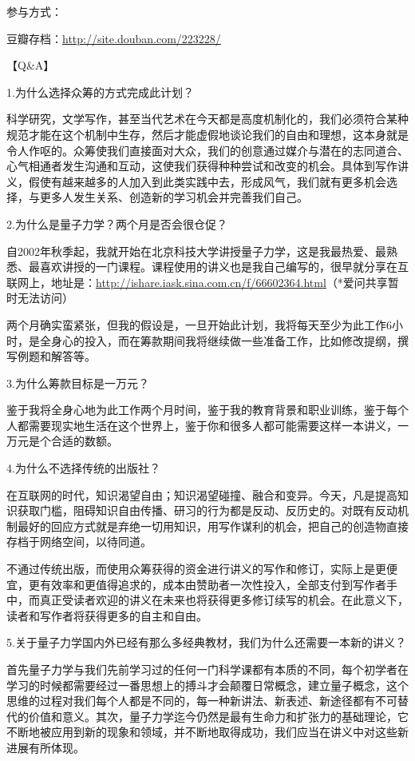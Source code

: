 参与方式：

豆瓣存档：\url{http://site.douban.com/223228/}

【Q\&A】

1.为什么选择众筹的方式完成此计划？

科学研究，文学写作，甚至当代艺术在今天都是高度机制化的，我们必须符合某种规范才能在这个机制中生存，然后才能虚假地谈论我们的自由和理想，这本身就是令人作呕的。众筹使我们直接面对大众，我们的创意通过媒介与潜在的志同道合、心气相通者发生沟通和互动，这使我们获得种种尝试和改变的机会。具体到写作讲义，假使有越来越多的人加入到此类实践中去，形成风气，我们就有更多机会选择，与更多人发生关系、创造新的学习机会并完善我们自己。

2.为什么是量子力学？两个月是否会很仓促？

自2002年秋季起，我就开始在北京科技大学讲授量子力学，这是我最热爱、最熟悉、最喜欢讲授的一门课程。课程使用的讲义也是我自己编写的，很早就分享在互联网上，地址是：\url{http://ishare.iask.sina.com.cn/f/66602364.html}（*爱问共享暂时无法访问）

两个月确实蛮紧张，但我的假设是，一旦开始此计划，我将每天至少为此工作6小时，是全身心的投入，而在筹款期间我将继续做一些准备工作，比如修改提纲，撰写例题和解答等。

3.为什么筹款目标是一万元？

鉴于我将全身心地为此工作两个月时间，鉴于我的教育背景和职业训练，鉴于每个人都需要现实地生活在这个世界上，鉴于你和很多人都可能需要这样一本讲义，一万元是个合适的数额。

4.为什么不选择传统的出版社？

在互联网的时代，知识渴望自由；知识渴望碰撞、融合和变异。今天，凡是提高知识获取门槛，阻碍知识自由传播、研习的行为都是反动、反历史的。对既有反动机制最好的回应方式就是弃绝一切用知识，用写作谋利的机会，把自己的创造物直接存档于网络空间，以待同道。

不通过传统出版，而使用众筹获得的资金进行讲义的写作和修订，实际上是更便宜，更有效率和更值得追求的，成本由赞助者一次性投入，全部支付到写作者手中，而真正受读者欢迎的讲义在未来也将获得更多修订续写的机会。在此意义下，读者和写作者将获得更多的自主和自由。

5.关于量子力学国内外已经有那么多经典教材，我们为什么还需要一本新的讲义？

首先量子力学与我们先前学习过的任何一门科学课都有本质的不同，每个初学者在学习的时候都需要经过一番思想上的搏斗才会颠覆日常概念，建立量子概念，这个思维的过程对我们每个人都是不同的，每一种新讲法、新表述、新途径都有不可替代的价值和意义。其次，量子力学迄今仍然是最有生命力和扩张力的基础理论，它不断地被应用到新的现象和领域，并不断地取得成功，我们应当在讲义中对这些新进展有所体现。

